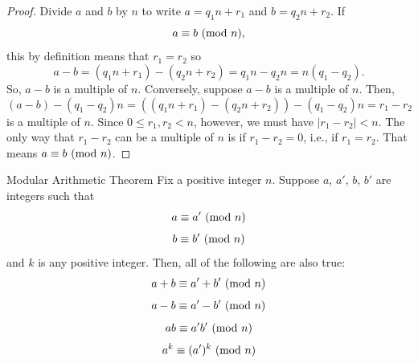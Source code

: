 \documentclass[letterpaper]{article}
\begin{document}
\begin{proof}
    Divide $a$ and $b$ by $n$ to write $a = q_1 n + r_1$ and $b = q_2 n + r_2$. If \[a \equiv b \ (\mathrm{mod}\ n),\] this by definition means that $r_1 = r_2$ so 
    \[a - b = (q_1 n + r_1) - (q_2 n + r_2) = q_1 n - q_2 n = n(q_1 - q_2).\]
    So, $a - b$ is a multiple of $n$. Conversely, suppose $a - b$ is a multiple of $n$. Then, 
    \[(a - b) - (q_1 - q_2)n = ((q_1 n + r_1) - (q_2 n + r_2)) - (q_1 - q_2)n = r_1 - r_2\]
    is a multiple of $n$. Since $0 \leq r_1, r_2 < n$, however, we must have $|r_1 - r_2| < n$. The only way that $r_1 - r_2$ can be a multiple of $n$ is if $r_1 - r_2 = 0$, i.e., if $r_1 = r_2$. That means $a \equiv b \ (\mathrm{mod}\ n)$. 
\end{proof}

\begin{theorem}{Modular Arithmetic Theorem}{}
    Fix a positive integer $n$. Suppose $a$, $a'$, $b$, $b'$ are integers such that 
    \[a \equiv a' \ (\mathrm{mod}\ n)\]
    \[b \equiv b' \ (\mathrm{mod}\ n)\]
    and $k$ is any positive integer. Then, all of the following are also true: 
    \[a + b \equiv a' + b' \ (\mathrm{mod}\ n)\]
    \[a - b \equiv a' - b' \ (\mathrm{mod}\ n)\]
    \[ab \equiv a'b' \ (\mathrm{mod}\ n)\]
    \[a^k \equiv (a')^k \ (\mathrm{mod}\ n)\]
\end{theorem}
\end{document}
